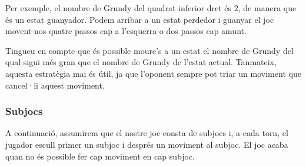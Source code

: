 \begin{center}
\end{center}


Per exemple, el nombre de Grundy del quadrat inferior dret és 2, de
manera que és un estat guanyador. Podem arribar a un estat perdedor i
guanyar el joc movent-nos quatre passos cap a l'esquerra o dos passos
cap amunt.

Tingueu en compte que és possible moure's a un estat el nombre de
Grundy del qual sigui més gran que el nombre de Grundy de l'estat
actual. Tanmateix, aquesta estratègia mai és útil, ja que l'oponent
sempre pot triar un moviment que cancel·li aquest moviment.

\subsubsection{Subjocs}

A continuació, assumirem que el nostre joc consta de subjocs i, a cada
torn, el jugador escull primer un subjoc i després un moviment al
subjoc. El joc acaba quan no és possible fer cap moviment en cap
subjoc.

